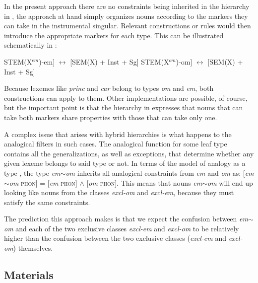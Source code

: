 In the present approach there are no  constraints being inherited in the hierarchy in , the approach at hand simply organizes nouns according to the markers they can take in the instrumental singular. Relevant constructions or rules would then introduce the appropriate markers for each type. This can be illustrated schematically in :

\begin{exe}
    \ex \label{exe-schema-new}
    \begin{xlist}
        \ex {[}STEM(X$^{em}$)-em{]} $\leftrightarrow$ {[}SEM(X) + Inst + Sg{]}
        \ex {[}STEM(X$^{om}$)-om{]} $\leftrightarrow$ {[}SEM(X) + Inst + Sg{]}
    \end{xlist}
\end{exe}

Because lexemes like \textit{princ} and \textit{car} belong to types \textit{om} and \textit{em}, both constructions can apply to them. Other implementations are possible, of course, but the important point is that the hierarchy in  expresses that nouns that can take both markers share properties with those that can take only one.

\largerpage[2]
A complex issue that arises with hybrid hierarchies is what happens to the analogical filters in such cases. The analogical function for some leaf type contains all the generalizations, as well as exceptions, that determine whether any given lexeme belongs to said type or not. In terms of the model of analogy as a type , the type \textit{em$\sim$om} inherits all analogical constraints from \textit{em} and \textit{om} as: [\textit{em$\sim$om} \textsc{phon}] = [\textit{em} \textsc{phon}] $\land$ [\textit{om} \textsc{phon}]. This means that nouns \textit{em$\sim$om} will end up looking like nouns from the classes \textit{excl-om} and \textit{excl-em}, because they must satisfy the same constraints.

The prediction this approach makes is that we expect the confusion between \textit{em$\sim$om} and each of the two exclusive classes \textit{excl-em} and \textit{excl-om} to be relatively higher than the confusion between the two exclusive classes (\textit{excl-em} and \textit{excl-om}) themselves.

\subsection{Materials}

